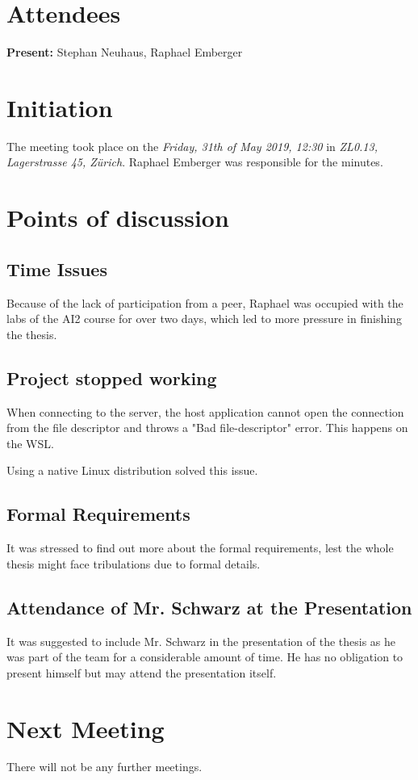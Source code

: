 \documentclass[10pt,a4paper,twoside,english,minutes]{zhawreprt}
\begin{document}
\maketitle

\section{Attendees}\label{sec:Attandees}
\textbf{Present:} Stephan Neuhaus, Raphael Emberger

\section{Initiation}\label{sec:Initiation}
The meeting took place on the \textit{Friday, 31th of May 2019, 12:30} in \textit{ZL0.13, Lagerstrasse 45, Zürich}. Raphael Emberger was responsible for the minutes.

\section{Points of discussion}
\subsection{Time Issues}
Because of the lack of participation from a peer, Raphael was occupied with the labs of the AI2 course for over two days, which led to more pressure in finishing the thesis.

\subsection{Project stopped working}
When connecting to the server, the host application cannot open the connection from the file descriptor and throws a "Bad file-descriptor" error. This happens on the WSL.

Using a native Linux distribution solved this issue.

\subsection{Formal Requirements}
It was stressed to find out more about the formal requirements, lest the whole thesis might face tribulations due to formal details.

\subsection{Attendance of Mr. Schwarz at the Presentation}
It was suggested to include Mr. Schwarz in the presentation of the thesis as he was part of the team for a considerable amount of time. He has no obligation to present himself but may attend the presentation itself.

\section*{Next Meeting}
There will not be any further meetings.
\end{document}
